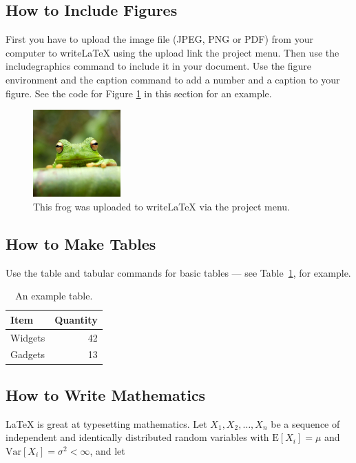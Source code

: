 \documentclass[a4paper]{article}
\begin{document}
\subsection{How to Include Figures}

First you have to upload the image file (JPEG, PNG or PDF) from your computer to writeLaTeX using the upload link the project menu. Then use the includegraphics command to include it in your document. Use the figure environment and the caption command to add a number and a caption to your figure. See the code for Figure \ref{fig:frog} in this section for an example.

\begin{figure}[ht]
\centering
\includegraphics[width=0.3\textwidth]{frog.jpg}
\caption{\label{fig:frog}This frog was uploaded to writeLaTeX via the project menu.}
\end{figure}

\subsection{How to Make Tables}

Use the table and tabular commands for basic tables --- see Table~\ref{tab:widgets}, for example.

\begin{table}[ht]
\centering
\begin{tabular}{l|r}
Item & Quantity \\\hline
Widgets & 42 \\
Gadgets & 13
\end{tabular}
\caption{\label{tab:widgets}An example table.}
\end{table}

\subsection{How to Write Mathematics}

\LaTeX{} is great at typesetting mathematics. Let $X_1, X_2, \ldots, X_n$ be a sequence of independent and identically distributed random variables with $\text{E}[X_i] = \mu$ and $\text{Var}[X_i] = \sigma^2 < \infty$, and let
\end{document}
